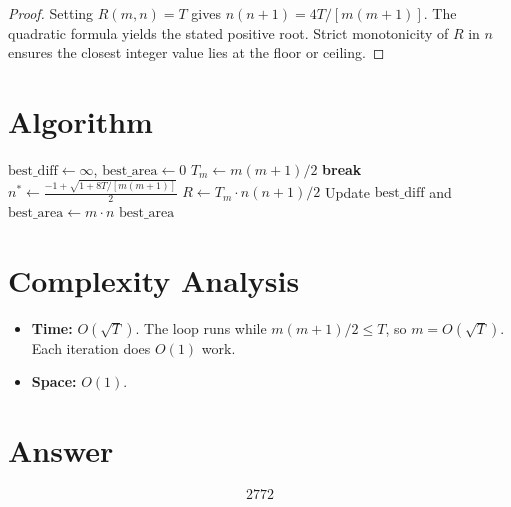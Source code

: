 \documentclass[12pt]{article}
\begin{document}
\begin{proof}
Setting $R(m,n) = T$ gives $n(n+1) = 4T/[m(m+1)]$. The quadratic formula yields the stated positive root. Strict monotonicity of $R$ in $n$ ensures the closest integer value lies at the floor or ceiling.
\end{proof}

\section{Algorithm}

\begin{algorithm}[H]
\caption{Find Grid with Nearest Rectangle Count to $T$}
\begin{algorithmic}[1]
\STATE $\text{best\_diff} \gets \infty$, $\text{best\_area} \gets 0$
    \STATE $T_m \gets m(m+1)/2$
        \STATE \textbf{break}
    \ENDIF
    \STATE $n^* \gets \frac{-1 + \sqrt{1 + 8T/[m(m+1)]}}{2}$
            \STATE $R \gets T_m \cdot n(n+1)/2$
                \STATE Update $\text{best\_diff}$ and $\text{best\_area} \gets m \cdot n$
            \ENDIF
        \ENDIF
    \ENDFOR
\ENDFOR
\RETURN $\text{best\_area}$
\end{algorithmic}
\end{algorithm}

\section{Complexity Analysis}

\begin{itemize}
    \item \textbf{Time:} $O(\sqrt{T})$. The loop runs while $m(m+1)/2 \leq T$, so $m = O(\sqrt{T})$. Each iteration does $O(1)$ work.
    \item \textbf{Space:} $O(1)$.
\end{itemize}

\section{Answer}

\[
\boxed{2772}
\]
\end{document}
